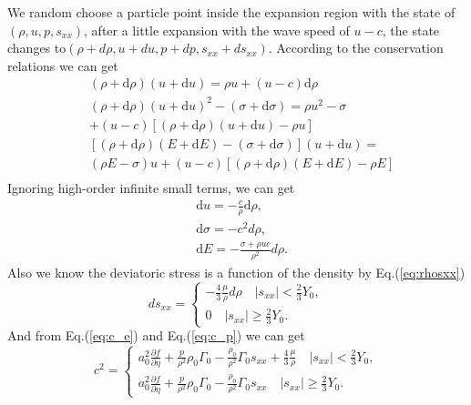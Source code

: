 \documentclass[review]{elsarticle}
\begin{document}
We random choose a particle point inside the expansion region with the state of $(\rho,u, p,s_{xx})$, after a little expansion with the wave speed of $u-c$, the state changes to$(\rho+d\rho, u+du, p+dp, s_{xx}+ds_{xx})$. According to the conservation relations we can get 
\begin{equation}
  \begin{aligned}
	& (\rho+ \text{d}\rho)(u+ \text{d}u) = \rho u +(u-c)\text{d}\rho\\
	& (\rho+\text{d}\rho)(u+\text{d}u)^2 -(\sigma+\text{d}\sigma)=   \rho u^2-\sigma\\
	&+(u-c)[(\rho+\text{d}\rho)(u+\text{d}u)-\rho u] \\
	& [(\rho+\text{d}\rho)(E+\text{d}E)-(\sigma+\text{d}\sigma)](u+\text{d}u) = \\
	&(\rho E-\sigma)u+(u-c)[(\rho+\text{d}\rho)(E+\text{d}E)-\rho E]\\
 \end{aligned}
\end{equation}
Ignoring high-order infinite small terms, we can get  
\begin{align}
  \label{eq:urho}
  & \text{d} u =-\frac{c}{\rho}\text{d}\rho,\\
\label{eq:sigmarho}
  & \text{d} \sigma = -c^2 d\rho,\\
 \label{eq:Erho}
  & \text{d} E = -\frac{\sigma+\rho u c}{\rho^2} d\rho.
\end{align}
Also we know the deviatoric stress is a function of the  density by Eq.(\ref{eq:rhosxx})   
\begin{equation}
  ds_{xx} = \left\{ \begin{aligned}
	  -\frac{4}{3}\frac{\mu}{\rho}d\rho \quad |s_{xx}| < \frac{2}{3}Y_0,\\
	  0  \quad  |s_{xx}| \ge  \frac{2}{3}Y_0.
	\end{aligned}
  \right.
\end{equation}
And from Eq.(\ref{eq:c_e}) and Eq.(\ref{eq:c_p}) we can get
\begin{equation}\label{eq:c_2rho}
  c^2 = \left\{ \begin{aligned}
	  a_0^2 \frac{\partial f}{\partial \eta} + \frac{p}{\rho^2}\rho_0\Gamma_0 -\frac{\rho_0}{\rho^2}\Gamma_0 s_{xx} +\frac{4}{3}\frac{\mu}{\rho} \quad |s_{xx}| < \frac{2}{3}Y_0,\\
	  a_0^2 \frac{\partial f}{\partial \eta} + \frac{p}{\rho^2}\rho_0\Gamma_0 -\frac{\rho_0}{\rho^2}\Gamma_0 s_{xx}  \quad  |s_{xx}| \ge  \frac{2}{3}Y_0.
	\end{aligned}
  \right.
\end{equation}
\end{document}
